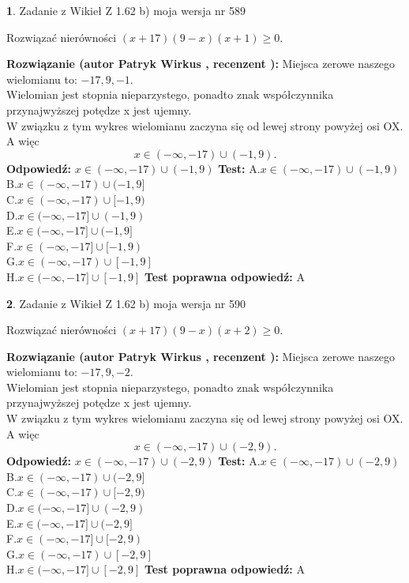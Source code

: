 \documentclass[12pt, a4paper]{article}
\theoremstyle{definition} %
\newtheorem{zad}{}
\newcommand{\zadStart}[1]{\begin{zad}#1\newline}
\newcommand{\zadStop}{\end{zad}}
\newcommand{\rozwStart}[2]{\noindent \textbf{Rozwiązanie (autor #1 , recenzent #2): }\newline}
\newcommand{\rozwStop}{\newline}
\newcommand{\odpStart}{\noindent \textbf{Odpowiedź:}\newline}
\newcommand{\odpStop}{\newline}
\newcommand{\testStart}{\noindent \textbf{Test:}\newline}
\newcommand{\testStop}{\newline}
\newcommand{\kluczStart}{\noindent \textbf{Test poprawna odpowiedź:}\newline}
\newcommand{\kluczStop}{\newline}
\begin{document}
\zadStart{Zadanie z Wikieł Z 1.62 b) moja wersja nr 589}

Rozwiązać nierówności $(x+17)(9-x)(x+1)\ge0$.
\zadStop
\rozwStart{Patryk Wirkus}{}
Miejsca zerowe naszego wielomianu to: $-17, 9, -1$.\\
Wielomian jest stopnia nieparzystego, ponadto znak współczynnika przy\linebreak najwyższej potędze x jest ujemny.\\ W związku z tym wykres wielomianu zaczyna się od lewej strony powyżej osi OX. A więc $$x \in (-\infty,-17) \cup (-1,9).$$
\rozwStop
\odpStart
$x \in (-\infty,-17) \cup (-1,9)$
\odpStop
\testStart
A.$x \in (-\infty,-17) \cup (-1,9)$\\
B.$x \in (-\infty,-17) \cup (-1,9]$\\
C.$x \in (-\infty,-17) \cup [-1,9)$\\
D.$x \in (-\infty,-17] \cup (-1,9)$\\
E.$x \in (-\infty,-17] \cup (-1,9]$\\
F.$x \in (-\infty,-17] \cup [-1,9)$\\
G.$x \in (-\infty,-17) \cup [-1,9]$\\
H.$x \in (-\infty,-17] \cup [-1,9]$
\testStop
\kluczStart
A
\kluczStop



\zadStart{Zadanie z Wikieł Z 1.62 b) moja wersja nr 590}

Rozwiązać nierówności $(x+17)(9-x)(x+2)\ge0$.
\zadStop
\rozwStart{Patryk Wirkus}{}
Miejsca zerowe naszego wielomianu to: $-17, 9, -2$.\\
Wielomian jest stopnia nieparzystego, ponadto znak współczynnika przy\linebreak najwyższej potędze x jest ujemny.\\ W związku z tym wykres wielomianu zaczyna się od lewej strony powyżej osi OX. A więc $$x \in (-\infty,-17) \cup (-2,9).$$
\rozwStop
\odpStart
$x \in (-\infty,-17) \cup (-2,9)$
\odpStop
\testStart
A.$x \in (-\infty,-17) \cup (-2,9)$\\
B.$x \in (-\infty,-17) \cup (-2,9]$\\
C.$x \in (-\infty,-17) \cup [-2,9)$\\
D.$x \in (-\infty,-17] \cup (-2,9)$\\
E.$x \in (-\infty,-17] \cup (-2,9]$\\
F.$x \in (-\infty,-17] \cup [-2,9)$\\
G.$x \in (-\infty,-17) \cup [-2,9]$\\
H.$x \in (-\infty,-17] \cup [-2,9]$
\testStop
\kluczStart
A
\kluczStop
\end{document}
